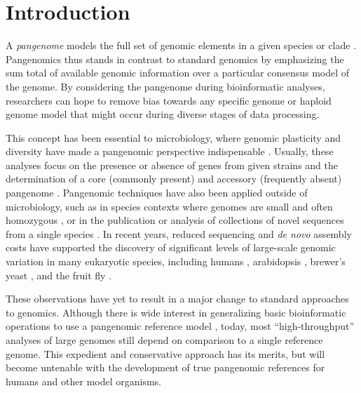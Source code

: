 \section{Introduction}

A \emph{pangenome} models the full set of genomic elements in a given species or clade \cite{sigaux2000cancer}.
Pangenomics thus stands in contrast to standard genomics by emphasizing the sum total of available genomic information over a particular consensus model of the genome.
By considering the pangenome during bioinformatic analyses, researchers can hope to remove bias towards any specific genome or haploid genome model that might occur during diverse stages of data processing.

This concept has been essential to microbiology, where genomic plasticity and diversity have made a pangenomic perspective indispensable \cite{tettelin2005genome,medini2005microbial}.
Usually, these analyses focus on the presence or absence of genes from given strains and the determination of a core (commonly present) and accessory (frequently absent) pangenome \cite{page2015roary}.
Pangenomic techniques have also been applied outside of microbiology, such as in species contexts where genomes are small and often homozygous \cite{cao2011whole}, or in the publication or analysis of collections of novel sequences from a single species \cite{gao2019tomato,brohammer2018maize,Ou_2018}.
In recent years, reduced sequencing and \emph{de novo} assembly costs have supported the discovery of significant levels of large-scale genomic variation in many eukaryotic species, including humans \cite{li2010building,sudmant2010,sudmant2015integrated,Hehir-Kwa2016-hb,chaisson2018multi,Audano_2019,Yang_2019}, arabidopsis \cite{alonso2016arabidopsis}, brewer's yeast \cite{yue2017contrasting}, and the fruit fly \cite{chakraborty2018hidden}.

These observations have yet to result in a major change to standard approaches to genomics.
Although there is wide interest in generalizing basic bioinformatic operations to use a pangenomic reference model \cite{computational2016computational}, today, most ``high-throughput'' analyses of large genomes still depend on comparison to a single reference genome.
This expedient and conservative approach has its merits, but will become untenable with the development of true pangenomic references for humans \cite{Church2015-vt} and other model organisms.

